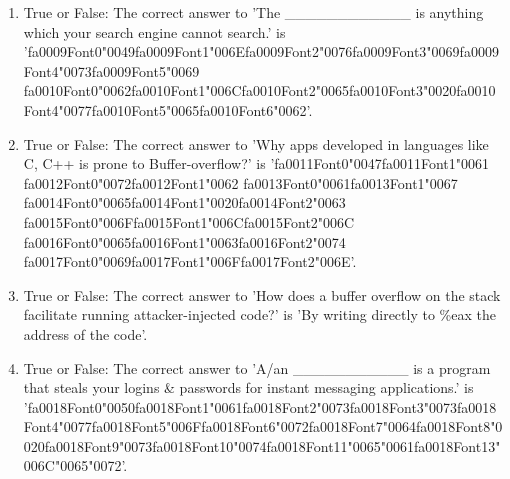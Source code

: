 \documentclass[12pt]{article}
\begin{document}
\begin{enumerate}[label=\arabic*.]
\item True or False: The correct answer to 'The \_\_\_\_\_\_\_\_\_\_\_\_ is anything which your search engine cannot search.' is '{\csname fa0009Font0\endcsname\char"0049}{\csname fa0009Font1\endcsname\char"006E}{\csname fa0009Font2\endcsname\char"0076}{\csname fa0009Font3\endcsname\char"0069}{\csname fa0009Font4\endcsname\char"0073}{\csname fa0009Font5\endcsname\char"0069} {\csname fa0010Font0\endcsname\char"0062}{\csname fa0010Font1\endcsname\char"006C}{\csname fa0010Font2\endcsname\char"0065}{\csname fa0010Font3\endcsname\char"0020}{\csname fa0010Font4\endcsname\char"0077}{\csname fa0010Font5\endcsname\char"0065}{\csname fa0010Font6\endcsname\char"0062}'.
\item True or False: The correct answer to 'Why apps developed in languages like C, C++ is prone to Buffer-overflow?' is '{\csname fa0011Font0\endcsname\char"0047}{\csname fa0011Font1\endcsname\char"0061} {\csname fa0012Font0\endcsname\char"0072}{\csname fa0012Font1\endcsname\char"0062} {\csname fa0013Font0\endcsname\char"0061}{\csname fa0013Font1\endcsname\char"0067} {\csname fa0014Font0\endcsname\char"0065}{\csname fa0014Font1\endcsname\char"0020}{\csname fa0014Font2\endcsname\char"0063} {\csname fa0015Font0\endcsname\char"006F}{\csname fa0015Font1\endcsname\char"006C}{\csname fa0015Font2\endcsname\char"006C} {\csname fa0016Font0\endcsname\char"0065}{\csname fa0016Font1\endcsname\char"0063}{\csname fa0016Font2\endcsname\char"0074} {\csname fa0017Font0\endcsname\char"0069}{\csname fa0017Font1\endcsname\char"006F}{\csname fa0017Font2\endcsname\char"006E}'.
\item True or False: The correct answer to 'How does a buffer overflow on the stack facilitate running attacker-injected code?' is 'By writing directly to \%eax the address of the code'.
\item True or False: The correct answer to 'A/an \_\_\_\_\_\_\_\_\_\_\_ is a program that steals your logins \& passwords for instant messaging applications.' is '{\csname fa0018Font0\endcsname\char"0050}{\csname fa0018Font1\endcsname\char"0061}{\csname fa0018Font2\endcsname\char"0073}{\csname fa0018Font3\endcsname\char"0073}{\csname fa0018Font4\endcsname\char"0077}{\csname fa0018Font5\endcsname\char"006F}{\csname fa0018Font6\endcsname\char"0072}{\csname fa0018Font7\endcsname\char"0064}{\csname fa0018Font8\endcsname\char"0020}{\csname fa0018Font9\endcsname\char"0073}{\csname fa0018Font10\endcsname\char"0074}{\csname fa0018Font11\endcsname\char"0065}{\char"0061}{\csname fa0018Font13\endcsname\char"006C}{\char"0065}{\char"0072}'.

\end{enumerate}
\end{document}
